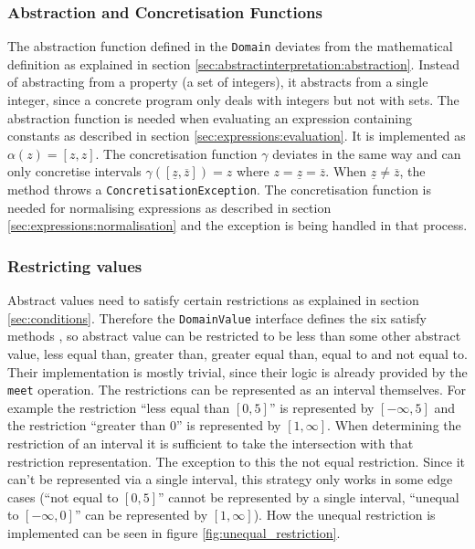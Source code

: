 

\subsubsection{Abstraction and Concretisation Functions}
The abstraction function defined in the \texttt{Domain} deviates from the mathematical definition as explained in section \ref{sec:abstractinterpretation:abstraction}. Instead of abstracting from a property (a set of integers), it abstracts from a single integer, since a concrete program only deals with integers but not with sets. The abstraction function is needed when evaluating an expression containing constants as described in section \ref{sec:expressions:evaluation}. It is implemented as $\alpha(z)=[z,z]$.
The concretisation function $\gamma$ deviates in the same way and can only concretise intervals $\gamma([\underline{z},\overline{z}])=z$ where $z = \underline{z} = \overline{z}$. When $\underline{z} \neq \overline{z}$, the method throws a \texttt{ConcretisationException}. The concretisation function is needed for normalising expressions as described in section \ref{sec:expressions:normalisation} and the exception is being handled in that process. 

\subsubsection{Restricting values}\label{sec:scalarvariables:intervals:restriction}

Abstract values need to satisfy certain restrictions as explained in section \ref{sec:conditions}. Therefore the \texttt{DomainValue} interface defines the six satisfy methods , so abstract value can be restricted to be less than some other abstract value, less equal than, greater than, greater equal than, equal to and not equal to. Their implementation is mostly trivial, since their logic is already provided by the \texttt{meet} operation. The restrictions can be represented as an interval themselves. For example the restriction ``less equal than $[0,5]$'' is represented by $[-\infty,5]$ and the restriction ``greater than $0$'' is represented by $[1,\infty]$. When determining the restriction of an interval it is sufficient to take the intersection with that restriction representation. The exception to this the not equal restriction. Since it can't be represented via a single interval, this strategy only works in some edge cases (``not equal to $[0,5]$'' cannot be represented by a single interval, ``unequal to $[-\infty,0]$'' can be represented by $[1,\infty]$). How the unequal restriction is implemented can be seen in figure \ref{fig:unequal_restriction}.

